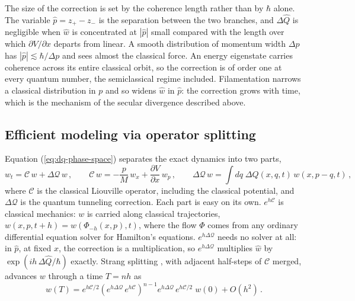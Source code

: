 \documentclass[12pt]{article}
\begin{document}
The size of the correction is set by the coherence length rather than by $\hbar$ alone.  The variable $\hat{p} = z_+ - z_-$ is the separation between the two branches, and $\Delta\hat{Q}$ is negligible when $\hat{w}$ is concentrated at $|\hat{p}|$ small compared with the length over which $\partial V/\partial x$ departs from linear.  A smooth distribution of momentum width $\Delta p$ has $|\hat{p}| \lesssim \hbar/\Delta p$ and sees almost the classical force.  An energy eigenstate carries coherence across its entire classical orbit, so the correction is of order one at every quantum number, the semiclassical regime included.  Filamentation narrows a classical distribution in $p$ and so widens $\hat{w}$ in $\hat{p}$: the correction grows with time, which is the mechanism of the secular divergence described above.

\subsection{Efficient modeling via operator splitting}\label{sec:splitting}
Equation (\ref{eq:dq-phase-space}) separates the exact dynamics into two parts,
\begin{equation}\label{eq:split-generator}
w_t = \mathcal{C}\,w + \Delta\mathcal{Q}\,w \,, \qquad
\mathcal{C}\,w = -\frac{p}{M}\,w_x + \frac{\partial V}{\partial x}\,w_p \,, \qquad
\Delta\mathcal{Q}\,w = \int dq\; \Delta Q(x,q,t)\, w(x,p-q,t) \,,
\end{equation}
where $\mathcal{C}$ is the classical Liouville operator, including the classical potential, and $\Delta\mathcal{Q}$ is the quantum tunneling correction.  Each part is easy on its own.  $e^{h\mathcal{C}}$ is classical mechanics: $w$ is carried along classical trajectories, $w(x,p,t+h) = w(\Phi_{-h}(x,p),t)$, where the flow $\Phi$ comes from any ordinary differential equation solver for Hamilton's equations.  $e^{h\Delta\mathcal{Q}}$ needs no solver at all: in $\hat{p}$, at fixed $x$, the correction is a multiplication, so $e^{h\Delta\mathcal{Q}}$ multiplies $\hat{w}$ by $\exp(ih\,\Delta\hat{Q}/\hbar)$ exactly.  Strang splitting \cite{strang1968}, with adjacent half-steps of $\mathcal{C}$ merged, advances $w$ through a time $T = nh$ as
\begin{equation}\label{eq:strang}
w(T) = e^{h\mathcal{C}/2}\left(e^{h\Delta\mathcal{Q}}\,e^{h\mathcal{C}}\right)^{n-1} e^{h\Delta\mathcal{Q}}\,e^{h\mathcal{C}/2}\; w(0) + O(h^2) \,.
\end{equation}
\end{document}
